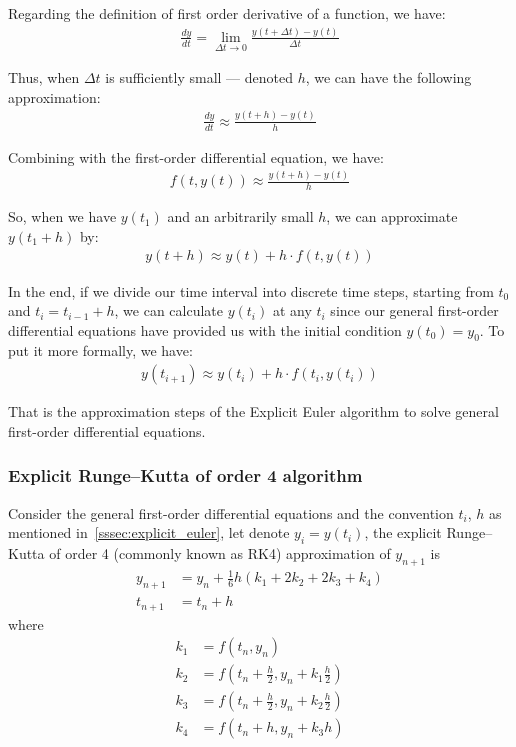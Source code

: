 \documentclass[a4paper]{article}
\numberwithin{equation}{section}
\begin{document}
Regarding the definition of first order derivative of a function, we have:
\begin{align*}
  \frac{dy}{dt} = \lim_{\Delta t \rightarrow 0} \frac{y(t + \Delta t) - y(t)}{\Delta t}
\end{align*}

Thus, when \(\Delta t\) is sufficiently small --- denoted \(h\), we can have the following approximation:
\begin{align*}
  \frac{dy}{dt} \approx \frac{y(t + h) - y(t)}{h}
\end{align*}

Combining with the first-order differential equation, we have:
\begin{align*}
  f(t,y(t)) \approx \frac{y(t + h) - y(t)}{h}
\end{align*}

So, when we have \(y(t_1)\) and an arbitrarily small \(h\), we can approximate \(y(t_1 + h)\) by:
\begin{align*}
  y(t + h) \approx y(t) + h \cdot f(t,y(t))
\end{align*}

In the end, if we divide our time interval into discrete time steps, starting from \(t_0\) and \(t_i = t_{i-1} + h\), we can calculate \(y(t_i)\) at any \(t_i\) since our general first-order differential equations have provided us with the initial condition \(y(t_0) = y_0\). To put it more formally, we have:
\begin{align*}
  y(t_{i+1}) \approx y(t_i) + h \cdot f(t_i, y(t_i))
\end{align*}

That is the approximation steps of the Explicit Euler algorithm to solve general first-order differential equations.

\subsubsection{Explicit Runge–Kutta of order 4 algorithm}
Consider the general first-order differential equations and the convention \(t_i\), \(h\) as mentioned in~\ref{sssec:explicit_euler}, let denote \(y_i = y(t_i)\), the explicit Runge–Kutta of order 4 (commonly known as RK4) approximation of \(y_{n+1}\) is
\begin{align*}
  y_{n+1} & = y_n + \frac{1}{6}h(k_1 + 2k_2 + 2k_3 + k_4) \\
  t_{n+1} & = t_n + h
\end{align*}
where
\begin{align*}
  k_1 & = f(t_n, y_n)                                            \\
  k_2 & = f \left(t_n + \frac{h}{2}, y_n + k_1\frac{h}{2}\right) \\
  k_3 & = f \left(t_n + \frac{h}{2}, y_n + k_2\frac{h}{2}\right) \\
  k_4 & = f(t_n + h, y_n + k_3h)
\end{align*}
\end{document}
